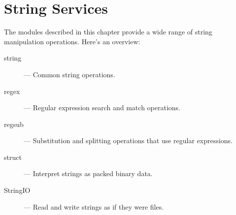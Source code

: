 \chapter{String Services}

The modules described in this chapter provide a wide range of string
manipulation operations.  Here's an overview:

\begin{description}

\item[string]
--- Common string operations.

\item[regex]
--- Regular expression search and match operations.

\item[regsub]
--- Substitution and splitting operations that use regular expressions.

\item[struct]
--- Interpret strings as packed binary data.

\item[StringIO]
--- Read and write strings as if they were files.

\end{description}
